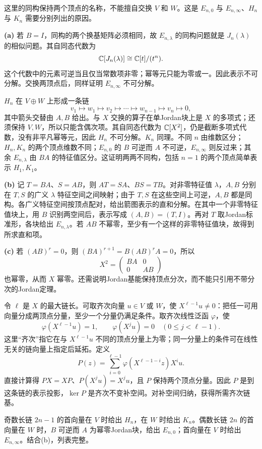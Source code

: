 \begin{solution}
这里的同构保持两个顶点的名称，不能擅自交换 $V$ 和 $W$。这是 $E_{n,0}$ 与 $E_{n,\infty}$、$H_n$ 与 $K_n$ 需要分别列出的原因。

\textbf{(a)} 若 $B=I$，同构的两个换基矩阵必须相同，故 $E_{n,\lambda}$ 的同构问题就是 $J_n(\lambda)$ 的相似问题。其自同态代数为
\[
 \mathbb C[J_n(\lambda)]\cong\mathbb C[t]/(t^n).
\]
这个代数中的元素可逆当且仅当常数项非零；幂等元只能为零或一。因此表示不可分解。交换两顶点后，同样证明 $E_{n,\infty}$ 不可分解。

$H_n$ 在 $V\oplus W$ 上形成一条链
\[
 v_1\longmapsto w_1\longmapsto v_2\longmapsto\cdots
 \longmapsto w_{n-1}\longmapsto v_n\longmapsto0,
\]
其中箭头交替由 $A,B$ 给出。与 $X$ 交换的算子在单Jordan块上是 $X$ 的多项式；还须保持 $V,W$，所以只能含偶次项。其自同态代数为 $\mathbb C[X^2]$，仍是截断多项式代数，没有非平凡幂等元，因此 $H_n$ 不可分解。$K_n$ 同理。不同 $n$ 由维数区分；$H_n,K_n$ 的两个顶点维数不同；$E_{n,0}$ 的 $B$ 可逆而 $A$ 不可逆，$E_{n,\infty}$ 则反过来；其余 $E_{n,\lambda}$ 由 $BA$ 的特征值区分。这证明两两不同构，包括 $n=1$ 的两个顶点简单表示 $H_1,K_1$。

\textbf{(b)} 记 $T=BA$、$S=AB$，则 $AT=SA$、$BS=TB$。对非零特征值 $\lambda$，$A,B$ 分别在 $T,S$ 的广义 $\lambda$ 特征空间之间映射；由于 $T,S$ 在这些空间上可逆，$A,B$ 都是同构。各广义特征空间按顶点配对，给出箭图表示的直和分解。在其中一个非零特征值块上，用 $B$ 识别两空间后，表示写成 $(A,B)=(T,I)$。再对 $T$ 取Jordan标准形，各块给出 $E_{n,\lambda}$。若 $AB$ 不幂零，至少有一个这样的非零特征值块，故得到所求直和项。

\textbf{(c)} 若 $(AB)^r=0$，则 $(BA)^{r+1}=B(AB)^rA=0$，所以
\[
 X^2=\begin{pmatrix}BA&0\\0&AB\end{pmatrix}
\]
也幂零，从而 $X$ 幂零。还需说明Jordan基能保持顶点分次，而不能只引用不带分次的Jordan定理。

令 $\ell$ 是 $X$ 的最大链长。可取齐次向量 $u\in V$ 或 $W$，使 $X^{\ell-1}u\ne0$：把任一可用向量分成两顶点分量，至少一个分量仍满足条件。取齐次线性泛函 $\varphi$，使
\[
 \varphi(X^{\ell-1}u)=1,\qquad
 \varphi(X^ju)=0\quad(0\le j<\ell-1).
\]
这里“齐次”指它在与 $X^{\ell-1}u$ 不同的顶点分量上为零；同一分量上的条件可在线性无关的链向量上指定后延拓。定义
\[
 P(z)=\sum_{i=0}^{\ell-1}\varphi(X^{\ell-1-i}z)X^iu.
\]
直接计算得 $PX=XP$、$P(X^ju)=X^ju$，且 $P$ 保持两个顶点分量。因此 $P$ 是到这条链的表示投影，$\ker P$ 是齐次不变补空间。对补空间归纳，获得所需齐次链基。

奇数长链 $2n-1$ 的首向量在 $V$ 时给出 $H_n$，在 $W$ 时给出 $K_n$。偶数长链 $2n$ 的首向量在 $W$ 时，$B$ 可逆而 $A$ 为幂零Jordan块，给出 $E_{n,0}$；首向量在 $V$ 时给出 $E_{n,\infty}$。结合(b)，列表完整。


\end{solution}

